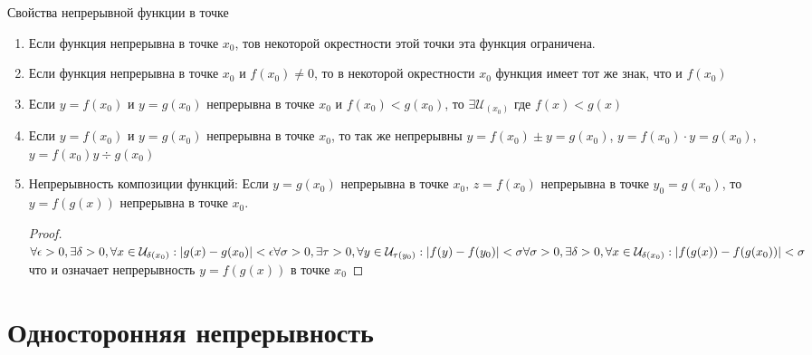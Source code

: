 \documentclass[oneside]{book}
\begin{document}
\begin{enumerate}
Свойства непрерывной функции в точке
\begin{enumerate}
    \item Если функция непрерывна в точке $x_0$, тов некоторой окрестности этой точки эта функция ограничена.
    \item Если функция непрерывна в точке $x_0$ и $f(x_0) \neq 0$, то в некоторой окрестности $x_0$ функция имеет тот же знак, что и $f(x_0)$
    \item Если $y = f(x_0)$ и $y = g(x_0)$ непрерывна в точке $x_0$ и $f(x_0) < g(x_0)$, то $\exists \mathcal{U}_{(x_0)}$ где $f(x) < g(x)$
    \item Если $y = f(x_0)$ и $y = g(x_0)$ непрерывна в точке $x_0$, то так же непрерывны $y = f(x_0) \pm y = g(x_0)$, $y = f(x_0) \cdot y = g(x_0)$, $y = f(x_0) y \div g(x_0)$
    \item Непрерывность композиции функций: Если $y = g(x_0)$ непрерывна в точке $x_0$, $z = f(x_0)$ непрерывна в точке $y_0 = g(x_0)$, то
          $y = f(g(x))$ непрерывна в точке $x_0$.
          \begin{proof}
            $ \\
            \forall \epsilon > 0, \exists \delta > 0, \forall x \in \mathcal{U}_{\delta(x_0)}: |g(x) - g(x_0)|<\epsilon \\
            \forall \sigma > 0, \exists \tau > 0, \forall y \in \mathcal{U}_{\tau(y_0)}: |f(y) - f(y_0)|<\sigma \\
            \forall \sigma > 0, \exists \delta > 0, \forall x \in \mathcal{U}_{\delta(x_0)}: |f(g(x)) - f(g(x_0))|<\sigma \\
            $
            что и означает непрерывность $y = f(g(x))$ в точке $x_0$
        \end{proof}
\end{enumerate}

\section[Односторонняя]{Односторонняя непрерывность}


\end{enumerate}
\end{document}
